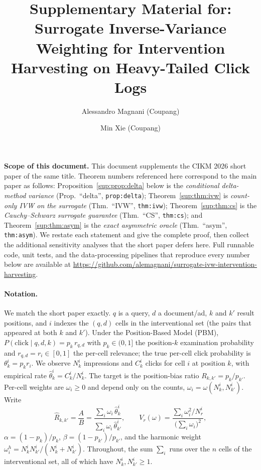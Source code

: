 \documentclass[11pt]{article}
\title{Supplementary Material for:\\
Surrogate Inverse-Variance Weighting for Intervention Harvesting
on Heavy-Tailed Click Logs}
\author{Alessandro Magnani (Coupang) \and Min Xie (Coupang)}
\date{}
\begin{document}
\maketitle

\noindent\textbf{Scope of this document.}
This document supplements the CIKM 2026 short paper of the same title.
Theorem numbers referenced here correspond to the main paper as follows:
Proposition~\ref{sup:prop:delta} below is the \emph{conditional
delta-method variance} (Prop.~``delta'', \texttt{prop:delta});
Theorem~\ref{sup:thm:ivw} is \emph{count-only IVW on the surrogate}
(Thm.~``IVW'', \texttt{thm:ivw}); Theorem~\ref{sup:thm:cs} is the
\emph{Cauchy--Schwarz surrogate guarantee} (Thm.~``CS'',
\texttt{thm:cs}); and Theorem~\ref{sup:thm:asym} is the
\emph{exact asymmetric oracle} (Thm.~``asym'', \texttt{thm:asym}).
We restate each statement and give the complete proof, then collect the
additional sensitivity analyses that the short paper defers here.
Full runnable code, unit tests, and the data-processing pipelines that
reproduce every number below are available at
\url{https://github.com/alemagnani/surrogate-ivw-intervention-harvesting}.

\paragraph{Notation.}
We match the short paper exactly. $q$ is a query, $d$ a document/ad,
$k$ and $k'$ result positions, and $i$ indexes the $(q,d)$ cells in the
interventional set (the pairs that appeared at both $k$ and $k'$). Under
the Position-Based Model (PBM),
$P(\mathrm{click}\mid q,d,k)=p_k\,r_{q,d}$ with $p_k\in(0,1]$ the
position-$k$ examination probability and $r_{q,d}=r_i\in[0,1]$ the
per-cell relevance; the true per-cell click probability is
$\theta_k^i=p_k r_i$. We observe $N_k^i$ impressions and $C_k^i$ clicks
for cell $i$ at position $k$, with empirical rate
$\hat\theta_k^i=C_k^i/N_k^i$. The target is the position-bias ratio
$R_{k,k'}=p_k/p_{k'}$. Per-cell weights are $\omega_i\ge 0$ and depend
only on the counts, $\omega_i=\omega(N_k^i,N_{k'}^i)$. Write
\[
\hat R_{k,k'}=\frac{A}{B}
=\frac{\sum_i\omega_i\,\hat\theta_k^i}{\sum_i\omega_i\,\hat\theta_{k'}^i},
\qquad
V_r(\omega)=\frac{\sum_i\omega_i^2/N_r^i}{\bigl(\sum_i\omega_i\bigr)^2},
\]
$\alpha=(1-p_k)/p_k$, $\beta=(1-p_{k'})/p_{k'}$, and the harmonic
weight $\omega_i^h=N_k^iN_{k'}^i/(N_k^i+N_{k'}^i)$. Throughout, the sum
$\sum_i$ runs over the $n$ cells of the interventional set, all of which
have $N_k^i,N_{k'}^i\ge 1$.
\end{document}
